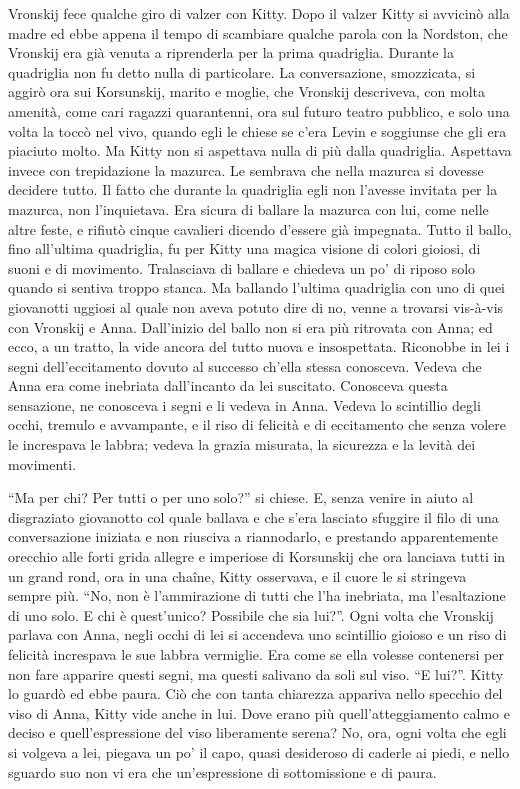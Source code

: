 Vronskij fece qualche giro di valzer con Kitty. Dopo il valzer Kitty si avvicinò alla madre ed ebbe appena il tempo di scambiare qualche parola con la Nordston, che Vronskij era già venuta a riprenderla per la prima quadriglia. Durante la quadriglia non fu detto nulla di particolare. La conversazione, smozzicata, si aggirò ora sui Korsunskij, marito e moglie, che Vronskij descriveva, con molta amenità, come cari ragazzi quarantenni, ora sul futuro teatro pubblico, e solo una volta la toccò nel vivo, quando egli le chiese se c'era Levin e soggiunse che gli era piaciuto molto. Ma Kitty non si aspettava nulla di più dalla quadriglia. Aspettava invece con trepidazione la mazurca. Le sembrava che nella mazurca si dovesse decidere tutto. Il fatto che durante la quadriglia egli non l'avesse invitata per la mazurca, non l'inquietava. Era sicura di ballare la mazurca con lui, come nelle altre feste, e rifiutò cinque cavalieri dicendo d'essere già impegnata. Tutto il ballo, fino all'ultima quadriglia, fu per Kitty una magica visione di colori gioiosi, di suoni e di movimento. Tralasciava di ballare e chiedeva un po' di riposo solo quando si sentiva troppo stanca. Ma ballando l'ultima quadriglia con uno di quei giovanotti uggiosi al quale non aveva potuto dire di no, venne a trovarsi vis-à-vis con Vronskij e Anna. Dall'inizio del ballo non si era più ritrovata con Anna; ed ecco, a un tratto, la vide ancora del tutto nuova e insospettata. Riconobbe in lei i segni dell'eccitamento dovuto al successo ch'ella stessa conosceva. Vedeva che Anna era come inebriata dall'incanto da lei suscitato. Conosceva questa sensazione, ne conosceva i segni e li vedeva in Anna. Vedeva lo scintillio degli occhi, tremulo e avvampante, e il riso di felicità e di eccitamento che senza volere le increspava le labbra; vedeva la grazia misurata, la sicurezza e la levità dei movimenti. 

``Ma per chi? Per tutti o per uno solo?'' si chiese. E, senza venire in aiuto al disgraziato giovanotto col quale ballava e che s'era lasciato sfuggire il filo di una conversazione iniziata e non riusciva a riannodarlo, e prestando apparentemente orecchio alle forti grida allegre e imperiose di Korsunskij che ora lanciava tutti in un grand rond, ora in una chaîne, Kitty osservava, e il cuore le si stringeva sempre più. ``No, non è l'ammirazione di tutti che l'ha inebriata, ma l'esaltazione di uno solo. E chi è quest'unico? Possibile che sia lui?''. Ogni volta che Vronskij parlava con Anna, negli occhi di lei si accendeva uno scintillio gioioso e un riso di felicità increspava le sue labbra vermiglie. Era come se ella volesse contenersi per non fare apparire questi segni, ma questi salivano da soli sul viso. ``E lui?''. Kitty lo guardò ed ebbe paura. Ciò che con tanta chiarezza appariva nello specchio del viso di Anna, Kitty vide anche in lui. Dove erano più quell'atteggiamento calmo e deciso e quell'espressione del viso liberamente serena? No, ora, ogni volta che egli si volgeva a lei, piegava un po' il capo, quasi desideroso di caderle ai piedi, e nello sguardo suo non vi era che un'espressione di sottomissione e di paura. 


